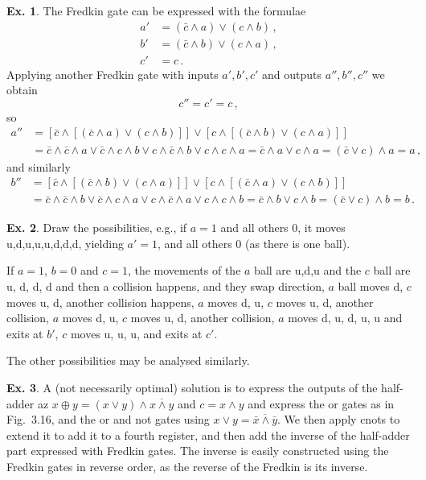 \documentclass[a4paper,12pt]{article}
\theoremstyle{definition}
\newtheorem{exercise}{Ex.}[section]
\begin{document}
\begin{exercise}
 The Fredkin gate can be expressed with the formulae
 \[\begin{aligned}
  a' &= (\bar{c}\land a) \lor (c\land b)\,,\\
  b' &= (\bar{c}\land b) \lor (c\land a)\,,\\
  c' &= c\,.
 \end{aligned}\]
 Applying another Fredkin gate with inputs $a', b', c'$ and outputs $a'', b'', c''$ we obtain
 \[
  c'' = c' = c\,,
 \]
so
 \[\begin{aligned}
  a'' &= \left[\bar{c}\land \left[ (\bar{c}\land a) \lor (c\land b)\right] \right] \lor \left[ c \land \left[(\bar{c}\land b) \lor (c\land a)\right]\right]\\
  &= \bar{c}\land\bar{c}\land a  \lor \bar{c}\land c \land b \lor c\land\bar{c}\land b \lor c\land c\land a = \bar{c}\land a \lor c\land a = (\bar{c}\lor c)\land a = a\,,
 \end{aligned}\]
 and similarly
 \[\begin{aligned}
  b'' &= \left[\bar{c}\land \left[ (\bar{c}\land b) \lor (c\land a)\right] \right] \lor \left[ c \land \left[(\bar{c}\land a) \lor (c\land b)\right]\right]\\
  &= \bar{c}\land\bar{c}\land b  \lor \bar{c}\land c \land a \lor c\land\bar{c}\land a \lor c\land c\land b = \bar{c}\land b \lor c\land b = (\bar{c}\lor c)\land b = b\,.
 \end{aligned}\]
\end{exercise}

\begin{exercise}
 Draw the possibilities, e.g., if $a=1$ and all others 0, it moves u,d,u,u,u,d,d,d, yielding $a'=1$, and all others 0 (as there is one ball).
 
 If $a=1$, $b=0$ and $c=1$, the movements of the $a$ ball are u,d,u and the $c$ ball are u, d, d, d and then a collision happens, and they swap direction, $a$ ball moves d, $c$ moves u, d, another collision happens, $a$ moves d, u, $c$ moves u, d, another collision, $a$ moves d, u, $c$ moves u, d, another collision, $a$ moves d, u, d, u, u and exits at $b'$, $c$ moves u, u, u, and exits at $c'$.
 
 The other possibilities may be analysed similarly.
\end{exercise}

\begin{exercise}
 A (not necessarily optimal) solution is to express the outputs of the half-adder az $x\oplus y = (x\lor y)\land \overline{x\land y}$ and $c = x\land y$ and express the {\sc or} gates as in Fig.\ 3.16, and the {\sc or} and {\sc not} gates using $x\lor y = \overline{\bar{x} \land \bar{y}}$. We then apply {\sc cnot}s to extend it to add it to a fourth register, and then add the inverse of the half-adder part expressed with Fredkin gates. The inverse is easily constructed using the Fredkin gates in reverse order, as the reverse of the Fredkin is its inverse.
\end{exercise}
\end{document}
